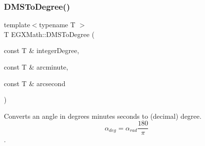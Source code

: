 \subsubsection{\texorpdfstring{D\+M\+S\+To\+Degree()}{DMSToDegree()}}
{\footnotesize\ttfamily template$<$typename T $>$ \\
T E\+G\+X\+Math\+::\+D\+M\+S\+To\+Degree (\begin{DoxyParamCaption}\item[{const T \&}]{integer\+Degree,  }\item[{const T \&}]{arcminute,  }\item[{const T \&}]{arcsecond }\end{DoxyParamCaption})}



Converts an angle in degrees minutes seconds to (decimal) degree. \[\alpha_{deg}=\alpha_{rad}\frac{180}{\pi}\]. 

